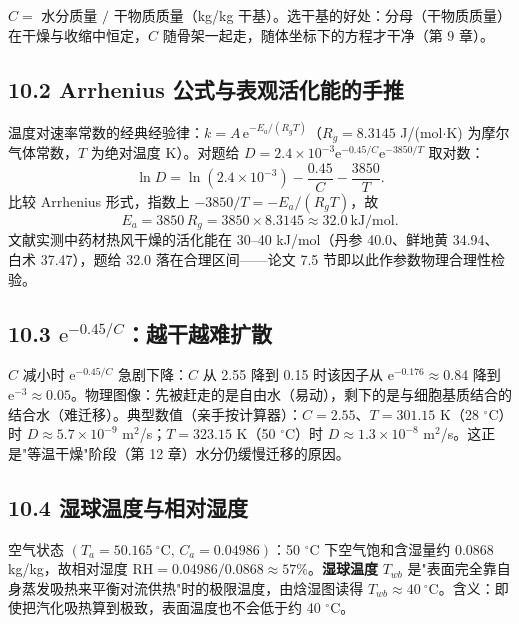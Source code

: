 \documentclass[12pt,a4paper]{ctexart}
\begin{document}
$C=$ 水分质量 $/$ 干物质质量（kg/kg 干基）。选干基的好处：分母（干物质质量）在干燥与收缩中恒定，$C$ 随骨架一起走，随体坐标下的方程才干净（第 9 章）。

\subsection{10.2 Arrhenius 公式与表观活化能的手推}

温度对速率常数的经典经验律：$k=A\,\mathrm{e}^{-E_a/(R_g T)}$（$R_g=8.3145$ J/(mol$\cdot$K) 为摩尔气体常数，$T$ 为绝对温度 K）。对题给 $D=2.4\times10^{-3}\mathrm{e}^{-0.45/C}\mathrm{e}^{-3850/T}$ 取对数：
\begin{equation}
\ln D=\ln(2.4\times10^{-3})-\frac{0.45}{C}-\frac{3850}{T}.
\end{equation}
比较 Arrhenius 形式，指数上 $-3850/T=-E_a/(R_g T)$，故
\begin{equation}
E_a=3850\,R_g=3850\times8.3145\approx32.0\ \mathrm{kJ/mol}.
\end{equation}
文献实测中药材热风干燥的活化能在 30--40 kJ/mol（丹参 40.0、鲜地黄 34.94、白术 37.47），题给 32.0 落在合理区间——论文 7.5 节即以此作参数物理合理性检验。

\subsection{10.3 $\mathrm{e}^{-0.45/C}$：越干越难扩散}

$C$ 减小时 $\mathrm{e}^{-0.45/C}$ 急剧下降：$C$ 从 2.55 降到 0.15 时该因子从 $\mathrm{e}^{-0.176}\approx0.84$ 降到 $\mathrm{e}^{-3}\approx0.05$。物理图像：先被赶走的是自由水（易动），剩下的是与细胞基质结合的结合水（难迁移）。典型数值（亲手按计算器）：$C=2.55$、$T=301.15$ K（28 $^\circ$C）时 $D\approx5.7\times10^{-9}$ m$^2$/s；$T=323.15$ K（50 $^\circ$C）时 $D\approx1.3\times10^{-8}$ m$^2$/s。这正是"等温干燥"阶段（第 12 章）水分仍缓慢迁移的原因。

\subsection{10.4 湿球温度与相对湿度}

空气状态 $(T_a=50.165\ ^\circ\mathrm{C},\,C_a=0.04986)$：50 $^\circ$C 下空气饱和含湿量约 0.0868 kg/kg，故相对湿度 $\mathrm{RH}=0.04986/0.0868\approx57\%$。\textbf{湿球温度} $T_{wb}$ 是"表面完全靠自身蒸发吸热来平衡对流供热"时的极限温度，由焓湿图读得 $T_{wb}\approx40\ ^\circ$C。含义：即使把汽化吸热算到极致，表面温度也不会低于约 40 $^\circ$C。
\end{document}

